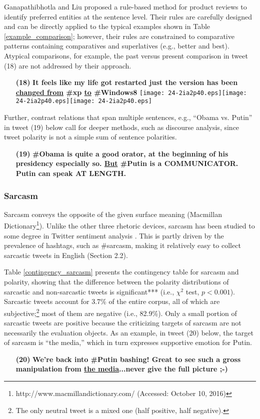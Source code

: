 \documentclass[english]{jnlp_1.4}
\begin{document}
Ganapathibhotla and Liu \citeyear{Ganapathibhotla08} proposed a rule-based method for product reviews to identify preferred entities at the sentence level. Their rules are carefully designed and can be directly applied to the typical examples shown in Table \ref{example_comparison}; however, their rules are constrained to comparative patterns containing comparatives and superlatives (e.g., better and best). Atypical comparisons, for example, the past versus present comparison in tweet (18) are not addressed by their approach.
\begin{enumerate}
\item[{\bf (18)}] {\bf It feels like my life got restarted just the version has been \underline{changed from} \#xp \underline{to} \#Windows8}  \texttt{[image: 24-2ia2p40.eps]}\texttt{[image: 24-2ia2p40.eps]}\texttt{[image: 24-2ia2p40.eps]}
\end{enumerate}

Further, contrast relations that span multiple sentences, e.g., ``Obama vs. Putin'' in tweet (19) below call for deeper methods, such as discourse analysis, since tweet polarity is not a simple sum of sentence polarities.
\begin{enumerate}
\item[{\bf (19)}] {\bf \#Obama is quite a good orator, at the beginning of his presidency especially so. \underline{But} \#Putin is a COMMUNICATOR. Putin can speak AT LENGTH.}
\end{enumerate}


\subsubsection{Sarcasm}

Sarcasm conveys the opposite of the given surface meaning (Macmillan Dictionary\footnote{http://www.macmillandictionary.com/ (Accessed: October 10, 2016)}). Unlike the other three rhetoric devices, sarcasm has been studied to some degree in Twitter sentiment analysis \cite{Davidov10,Roberto11,Reyes13,Tungthamthiti15}. This is partly driven by the prevalence of hashtags, such as \#sarcasm, making it relatively easy to collect sarcastic tweets in English (Section 2.2).

Table \ref{contingency_sarcasm} presents the contingency table for sarcasm and polarity, showing that the difference between the polarity distributions of sarcastic and non-sarcastic tweets is significant*** (i.e., $\chi^2$ test, $p < 0.001$). Sarcastic tweets account for 3.7\% of the entire corpus, all of which are subjective;\footnote{The only neutral tweet is a mixed one (half positive, half negative).} most of them are negative (i.e., 82.9\%). Only a small portion of sarcastic tweets are positive because the criticizing targets of sarcasm are not necessarily the evaluation objects. As an example, in tweet (20) below, the target of sarcasm is ``the media,'' which in turn expresses supportive emotion for Putin.
\begin{enumerate}
\item[{\bf (20)}] {\bf We're back into \#Putin bashing! Great to see such a gross manipulation from \underline{the media}...never give the full picture ;-)}
\end{enumerate}
\end{document}
